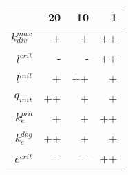 \begin{tabular}{r| r r r }
&20 &10 &1 \\
\hline 
$k_{div}^{max}$&+ &+ &++ \\
$l^{crit}$&- &- &++ \\
$l^{init}$&+ &++ &+ \\
$q_{init}$&++ &+ &+ \\
$k_{e}^{pro}$&+ &+ &++ \\
$k_{e}^{deg}$&++ &+ &+ \\
$e^{crit}$&- - &- - &++ \\
\end{tabular}

